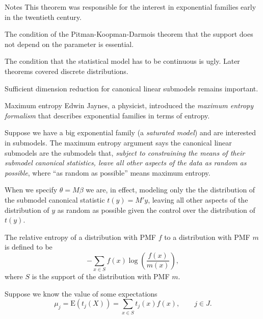 \documentclass[
  ignorenonframetext,
]{beamer}
\begin{document}
\begin{frame}{Notes}
\protect\hypertarget{notes-1}{}
This theorem was responsible for the interest in exponential families
early in the twentieth century.

\vspace{12pt}

The condition of the Pitman-Koopman-Darmois theorem that the support
does not depend on the parameter is essential.

\vspace{12pt}

The condition that the statistical model has to be continuous is ugly.
Later theorems covered discrete distributions.

\vspace{12pt}

Sufficient dimension reduction for canonical linear submodels remains
important.
\end{frame}

\begin{frame}{Maximum entropy}
\protect\hypertarget{maximum-entropy}{}
Edwin Jaynes, a physicist, introduced the \emph{maximum entropy
formalism} that describes exponential families in terms of entropy.

\vspace{12pt}

Suppose we have a big exponential family (a \emph{saturated model}) and
are interested in submodels. The maximum entropy argument says the
canonical linear submodels are the submodels that, \emph{subject to
constraining the means of their submodel canonical statistics, leave all
other aspects of the data as random as possible}, where ``as random as
possible'' means maximum entropy.

\vspace{12pt}

When we specify \(\theta = M\beta\) we are, in effect, modeling only the
the distribution of the submodel canonical statistic \(t(y) = M' y\),
leaving all other aspects of the distribution of \(y\) as random as
possible given the control over the distribution of \(t(y)\).
\end{frame}

\begin{frame}{}
\protect\hypertarget{section-11}{}
The relative entropy of a distribution with PMF \(f\) to a distribution
with PMF \(m\) is defined to be \[
  -\sum_{x\in S} f(x)\log\left(\frac{f(x)}{m(x)}\right),
\] where \(S\) is the support of the distribution with PMF \(m\).

\vspace{12pt}

Suppose we know the value of some expectations \[
  \mu_j = \text{E}\left(t_j(X)\right) = \sum_{x\in S} t_j(x)f(x), \qquad j \in J.
\]
\end{frame}
\end{document}
